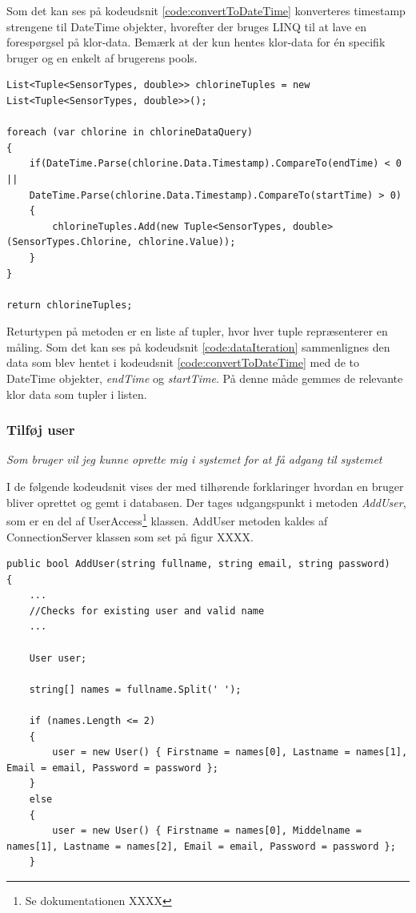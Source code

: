 Som det kan ses på kodeudsnit \ref{code:convertToDateTime} konverteres timestamp strengene til DateTime objekter, hvorefter der bruges LINQ til at lave en forespørgsel på klor-data. Bemærk at der kun hentes klor-data for én specifik bruger og en enkelt af brugerens pools.

\begin{lstlisting}[caption=Iteration over indhentet pool data,label=code:dataIteration]
List<Tuple<SensorTypes, double>> chlorineTuples = new List<Tuple<SensorTypes, double>>();

foreach (var chlorine in chlorineDataQuery)
{
	if(DateTime.Parse(chlorine.Data.Timestamp).CompareTo(endTime) < 0 ||
	DateTime.Parse(chlorine.Data.Timestamp).CompareTo(startTime) > 0)
	{
		chlorineTuples.Add(new Tuple<SensorTypes, double>(SensorTypes.Chlorine, chlorine.Value));
	}
}

return chlorineTuples;
\end{lstlisting}

Returtypen på metoden er en liste af tupler, hvor hver tuple repræsenterer en måling. Som det kan ses på kodeudsnit \ref{code:dataIteration} sammenlignes den data som blev hentet i kodeudsnit \ref{code:convertToDateTime} med de to DateTime objekter, \textit{endTime} og \textit{startTime}. På denne måde gemmes de relevante klor data som tupler i listen.

\subsubsection{Tilføj user}

\textit{Som bruger vil jeg kunne oprette mig i systemet for at få adgang til systemet}

I de følgende kodeudsnit vises der med tilhørende forklaringer hvordan en bruger bliver oprettet og gemt i databasen. Der tages udgangspunkt i metoden \textit{AddUser}, som er en del af UserAccess\footnote{Se dokumentationen XXXX} klassen. AddUser metoden kaldes af ConnectionServer klassen  som set på figur XXXX.
 
\begin{lstlisting}[caption=User laves lokalt hvorefter User's navne properties sættes, label=code:adduser1]
public bool AddUser(string fullname, string email, string password)
{
	...
	//Checks for existing user and valid name
	...
	
	User user;

	string[] names = fullname.Split(' ');

	if (names.Length <= 2)
	{
		user = new User() { Firstname = names[0], Lastname = names[1], Email = email, Password = password };
	}
	else
	{
		user = new User() { Firstname = names[0], Middelname = names[1], Lastname = names[2], Email = email, Password = password };
	}
\end{lstlisting}

